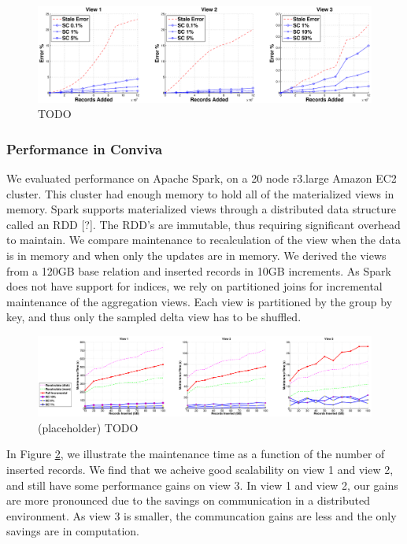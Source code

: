 \begin{figure}[ht!]
\label{exp5conviva}
\centering
\includegraphics[width=\textwidth]{exp/exp5-coniva-accuracy-woutlier.eps}
 \caption{TODO}
\end{figure}

\subsubsection{Performance in Conviva}
We evaluated performance on Apache Spark, on a 20 node r3.large Amazon EC2 cluster. 
This cluster had enough memory to hold all of the materialized views in memory.
Spark supports materialized views through a distributed data structure called an RDD [?].
The RDD's are immutable, thus requiring significant overhead to maintain.
We compare maintenance to recalculation of the view when the data is in memory and when only the updates are in memory. 
We derived the views from a 120GB base relation and inserted records in 10GB increments.
As Spark does not have support for indices, we rely on partitioned joins for incremental maintenance of the aggregation views.
Each view is partitioned by the group by key, and thus only the sampled delta view has to be shuffled. 

\begin{figure}[ht!]
\label{exp6conviva}
\centering
\includegraphics[width=\textwidth]{exp/exp5-efficiency-conviva.eps}
 \caption{(placeholder) TODO}
\end{figure}

In Figure \ref{exp6conviva}, we illustrate the maintenance time as a function of the number of inserted records.
We find that we acheive good scalability on view 1 and view 2, and still have some performance gains on view 3.
In view 1 and view 2, our gains are more pronounced due to the savings on communication in a distributed environment.
As view 3 is smaller, the communcation gains are less and the only savings are in computation.

